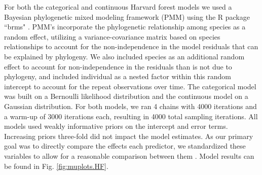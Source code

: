 \documentclass[11pt]{article}\usepackage[]{graphicx}\usepackage[]{color}
\begin{document}
For both the categorical and continuous Harvard forest models we used a Bayesian phylogenetic mixed modeling framework (PMM) \citep{Garamszegi2014} using the R package ``brms" \citep{Burkner2018}. PMM's incorporate the phylogenetic relationship among species as a random effect, utilizing a variance-covariance matrix based on species relationships to account for the non-independence in the model residuals that can be explained by phylogeny. We also included species as an additional random effect to account for non-independence in the residuals than is not due to phylogeny, and included individual as a nested factor within this random intercept to account for the repeat observations over time. The categorical model was built on a Bernoulli likelihood distribution and the continuous model on a Gaussian distribution. For both models, we ran 4 chains with 4000 iterations and a warm-up of 3000 iterations each, resulting in 4000 total sampling iterations. All models used weakly informative priors on the intercept and error terms. Increasing priors three-fold did not impact the model estimates. As our primary goal was to directly compare the effects each predictor, we standardized these variables to allow for a reasonable comparison between them {\citep{Gelman2007}. Model results can be found in Fig. \ref{fig:muplots.HF}.\\

%
%
%
%

}
\end{document}

